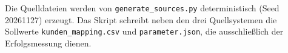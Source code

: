 Die Quelldateien werden von \texttt{generate\_sources.py} deterministisch (Seed 20261127) erzeugt. Das Skript schreibt neben den drei Quellsystemen die Sollwerte \texttt{kunden\_mapping.csv} und \texttt{parameter.json}, die ausschließlich der Erfolgsmessung dienen.


% 
